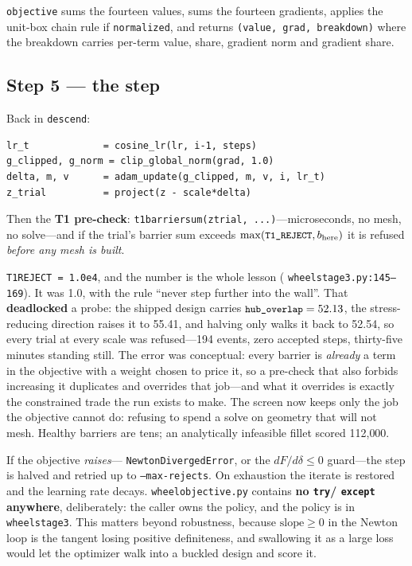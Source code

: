 \documentclass[11pt,a4paper]{article}
\DeclareRobustCommand{\code}[1]{%
  \texttt{\small\def\_{\textunderscore\discretionary{}{}{}}#1}}
\newcommand{\at}[2]{\code{#1:#2}}
\begin{document}
\code{objective} sums the fourteen values, sums the fourteen gradients, applies the
unit-box chain rule if \code{normalized}, and returns \code{(value, grad, breakdown)}
where the breakdown carries per-term value, share, gradient norm and gradient share.

\subsection*{Step 5 --- the step}

Back in \code{descend}:

\begin{lstlisting}[style=py]
lr_t             = cosine_lr(lr, i-1, steps)
g_clipped, g_norm = clip_global_norm(grad, 1.0)
delta, m, v      = adam_update(g_clipped, m, v, i, lr_t)
z_trial          = project(z - scale*delta)
\end{lstlisting}

Then the \textbf{T1 pre-check}: \code{t1\_barrier\_sum(z\_trial, ...)}---microseconds,
no mesh, no solve---and if the trial's barrier sum exceeds
$\max(\code{T1\_REJECT}, b_{\text{here}})$ it is refused \emph{before any mesh is
built}.

\code{T1\_REJECT = 1.0e4}, and the number is the whole lesson
(\at{wheel\_stage3.py}{145--169}). It was 1.0, with the rule ``never step further into
the wall''. That \textbf{deadlocked} a probe: the shipped design carries
$\code{hub\_overlap} = 52.13$, the stress-reducing direction raises it to 55.41, and
halving only walks it back to 52.54, so every trial at every scale was refused---194
events, zero accepted steps, thirty-five minutes standing still. The error was
conceptual: every barrier is \emph{already} a term in the objective with a weight
chosen to price it, so a pre-check that also forbids increasing it duplicates and
overrides that job---and what it overrides is exactly the constrained trade the run
exists to make. The screen now keeps only the job the objective cannot do: refusing to
spend a solve on geometry that will not mesh. Healthy barriers are tens; an analytically
infeasible fillet scored 112{,}000.

If the objective \emph{raises}---\code{NewtonDivergedError}, or the
$dF/d\delta \le 0$ guard---the step is halved and retried up to \code{--max-rejects}. On
exhaustion the iterate is restored and the learning rate decays.
\code{wheel\_objective.py} contains \textbf{no \code{try}/\code{except} anywhere},
deliberately: the caller owns the policy, and the policy is in \code{wheel\_stage3}.
This matters beyond robustness, because $\mathrm{slope} \ge 0$ in the Newton loop is the
tangent losing positive definiteness, and swallowing it as a large loss would let the
optimizer walk into a buckled design and score it.
\end{document}
